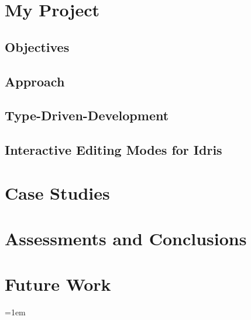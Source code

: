 \documentclass[a4paper, notitlepage]{report}
\begin{document}
\chapter{My Project}
\label{sec:org2f1c773}

\section{Objectives}
\label{sec:orgd4112e3}

\section{Approach}
\label{sec:org5e857f0}

\section{Type-Driven-Development}
\label{sec:org85e0b33}

\section{Interactive Editing Modes for Idris}
\label{sec:org27eae2a}
\chapter{Case Studies}
\label{sec:orgaa19de9}
\chapter{Assessments and Conclusions}
\label{sec:org0e6f1e0}
\chapter{Future Work}
\label{sec:org8833aa4}

\emergencystretch=1em
\printbibliography[heading=bibintoc, title=References]
\appendix
\end{document}

